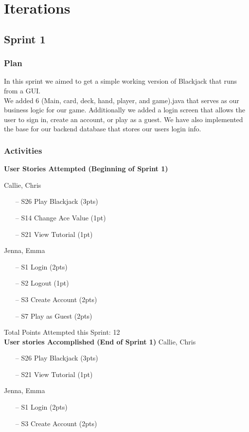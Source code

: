 \section{Iterations} 
\subsection{Sprint 1}
\subsubsection{Plan}
In this sprint we aimed to get a simple working version of Blackjack that runs from a GUI. \\

\noindent We added 6 (Main, card, deck, hand, player, and game).java that serves as our business logic for our game. Additionally we added a login screen that allows the user to sign in, create an account, or play as a guest. We have also implemented the base for our backend database that stores our users login info.

\subsubsection{Activities}

\textbf{User Stories Attempted (Beginning of Sprint 1)}

Callie, Chris 
\begin{itemize}
    \item [--] S26 Play Blackjack (3pts) 
    \item [--] S14 Change Ace Value (1pt)
    \item [--] S21 View Tutorial (1pt)
\end{itemize} 
Jenna, Emma
\begin{itemize}
    \item [--] S1 Login (2pts) 
    \item [--] S2 Logout (1pt)
    \item [--] S3 Create Account (2pts)
    \item [--] S7 Play as Guest (2pts)
\end{itemize} 

Total Points Attempted this Sprint: 12\\

\textbf{User stories Accomplished (End of Sprint 1)}
Callie, Chris
\begin{itemize}
    \item [--] S26 Play Blackjack (3pts)
    \item [--] S21 View Tutorial (1pt)
\end{itemize} 
Jenna, Emma
\begin{itemize}
    \item [--] S1 Login (2pts) 
    \item [--] S3 Create Account (2pts)
\end{itemize} 

